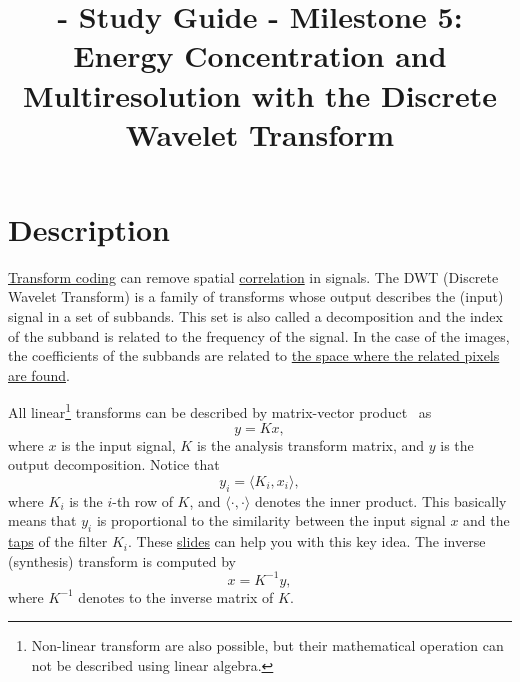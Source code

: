 
\title{\SM{} - Study Guide - Milestone 5: Energy Concentration and Multiresolution  with the Discrete Wavelet Transform}

\maketitle

\section{Description}

\href{https://web.stanford.edu/class/ee398a/handouts/lectures/07-TransformCoding.pdf}{Transform
  coding} can remove spatial
\href{https://en.wikipedia.org/wiki/Correlation_and_dependence}{correlation}
in signals. The DWT (Discrete Wavelet Transform) is a family of
transforms whose output describes the (input) signal in a set of
subbands. This set is also called a decomposition and the index of the
subband is related to the frequency of the signal. In the case of the
images, the coefficients of the subbands are related to
\href{https://en.wikipedia.org/wiki/Discrete_wavelet_transform#/media/File:Jpeg2000_2-level_wavelet_transform-lichtenstein.png}{the
  space where the related pixels are found}.

All linear\footnote{Non-linear transform are also possible, but their
  mathematical operation can not be described using linear algebra.}
transforms can be described by matrix-vector
product~\cite{strang4linear} as
\begin{equation}
  y = Kx,
  \label{eq:forward_transform_matrix_form}
\end{equation}
where $x$ is the input signal, $K$ is the analysis transform matrix,
and $y$ is the output decomposition. Notice that
\begin{equation}
  y_i = \langle K_i, x_i\rangle,
\end{equation}
where $K_i$ is the $i$-th row of $K$, and $\langle\cdot,\cdot\rangle$
denotes the inner product. This basically means that $y_i$ is
proportional to the similarity between the input signal $x$ and the
\href{https://en.wikipedia.org/wiki/Finite_impulse_response}{taps} of
the filter $K_i$. These
\href{https://cseweb.ucsd.edu/classes/fa17/cse166-a/lec13.pdf}{slides}
can help you with this key idea. The inverse (synthesis) transform is
computed by
\begin{equation}
  x = K^{-1}y,
  \label{eq:backward_transform_matrix_form}
\end{equation}
where $K^{-1}$ denotes to the inverse matrix of $K$.

